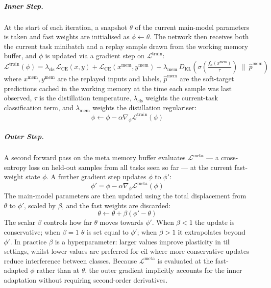 \subparagraph{Inner Step.} At the start of each iteration, a snapshot
$\theta$ of the current main-model parameters is taken and fast weights are
initialised as $\phi \leftarrow \theta$. The network then receives both the
current task minibatch and a replay sample drawn from the working memory buffer,
and $\phi$ is updated via a gradient step on $\mathcal{L}^{\text{train}}$:
%
\begin{equation}\label{eqn:bcl_inner}
    \mathcal{L}^{\text{train}}(\phi) =
    \lambda_{\text{cls}} \, \mathcal{L}_{\text{CE}}(x, y)
    + \mathcal{L}_{\text{CE}}(x^{\text{mem}}, y^{\text{mem}})
    + \lambda_{\text{mem}} \,
      D_{\text{KL}}\!\left(
          \sigma\!\left(\tfrac{f_\phi(x^{\text{mem}})}{\tau}\right)
          \;\Big\|\;
          \hat{p}^{\text{mem}}
      \right)
\end{equation}
%
where $x^{\text{mem}}, y^{\text{mem}}$ are the replayed inputs and labels,
$\hat{p}^{\text{mem}}$ are the soft-target predictions cached in the working
memory at the time each sample was last observed, $\tau$ is the distillation
temperature, $\lambda_{\text{cls}}$ weights the current-task classification
term, and $\lambda_{\text{mem}}$ weights the distillation regulariser:
%
\begin{equation}
    \phi \leftarrow \phi - \alpha \nabla_\phi \mathcal{L}^{\text{train}}(\phi)
\end{equation}

\subparagraph{Outer Step.} A second forward pass on the meta memory buffer
evaluates $\mathcal{L}^{\text{meta}}$ — a cross-entropy loss on held-out samples
from all tasks seen so far — at the current fast-weight state $\phi$. A further
gradient step updates $\phi$ to $\phi'$:
%
\begin{equation}
    \phi' = \phi - \alpha \nabla_{\phi} \mathcal{L}^{\text{meta}}(\phi)
\end{equation}
%
The main-model parameters are then updated using the total displacement from
$\theta$ to $\phi'$, scaled by $\beta$, and the fast weights are discarded:
%
\begin{equation}\label{eqn:bcl_outer}
    \theta \leftarrow \theta + \beta \left( \phi' - \theta \right)
\end{equation}
%
The scalar $\beta$ controls how far $\theta$ moves towards $\phi'$. When
$\beta < 1$ the update is conservative; when $\beta = 1$ $\theta$ is set equal
to $\phi'$; when $\beta > 1$ it extrapolates beyond $\phi'$. In practice
$\beta$ is a hyperparameter: larger values improve plasticity in \gls{til}
settings, whilst lower values are preferred for \gls{cil} where more
conservative updates reduce interference between classes. Because
$\mathcal{L}^{\text{meta}}$ is evaluated at the fast-adapted $\phi$ rather
than at $\theta$, the outer gradient implicitly accounts for the inner
adaptation without requiring second-order derivatives.

